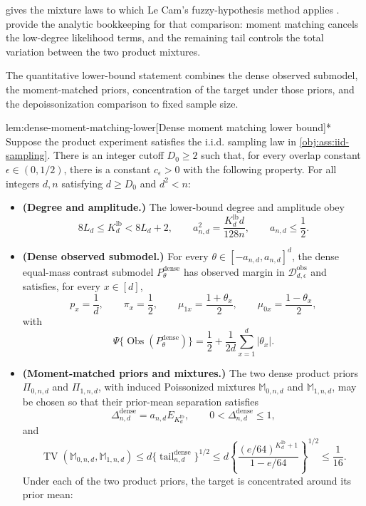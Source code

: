  gives the mixture laws to which Le Cam's fuzzy-hypothesis method applies \citep{LeCam1986,Tsybakov2009}.  provide the analytic bookkeeping for that comparison: moment matching cancels the low-degree likelihood terms, and the remaining tail controls the total variation between the two product mixtures.

The quantitative lower-bound statement combines the dense observed submodel, the moment-matched priors, concentration of the target under those priors, and the depoissonization comparison to fixed sample size.

\begin{lemmav}{lem:dense-moment-matching-lower}[Dense moment matching lower bound]*
Suppose the product experiment satisfies the i.i.d. sampling law in \cref{obj:ass:iid-sampling}.  There is an integer cutoff \(D_0\geq2\) such that, for every overlap constant \(\epsilon\in(0,1/2)\), there is a constant \(c_\epsilon>0\) with the following property.  For all integers \(d,n\) satisfying \(d\geq D_0\) and \(d^2<n\):
\begin{itemize}
\item \textbf{(Degree and amplitude.)} The lower-bound degree and amplitude obey
\[
8L_d\leq K_d^{\mathrm{lb}}<8L_d+2,
\qquad
a_{n,d}^2=\frac{K_d^{\mathrm{lb}}d}{128n},
\qquad
a_{n,d}\leq \frac12 .
\]
\item \textbf{(Dense observed submodel.)} For every \(\theta\in[-a_{n,d},a_{n,d}]^d\), the dense equal-mass contrast submodel \(P_\theta^{\mathrm{dense}}\) has observed margin in \(\mathcal D_{d,\epsilon}^{\mathrm{obs}}\) and satisfies, for every \(x\in[d]\),
\[
p_x=\frac1d,
\qquad
\pi_x=\frac12,
\qquad
\mu_{1x}=\frac{1+\theta_x}{2},
\qquad
\mu_{0x}=\frac{1-\theta_x}{2},
\]
with
\[
\Psi\{\operatorname{Obs}(P_\theta^{\mathrm{dense}})\}
=
\frac12+\frac{1}{2d}\sum_{x=1}^d|\theta_x|.
\]
\item \textbf{(Moment-matched priors and mixtures.)} The two dense product priors \(\Pi_{0,n,d}\) and \(\Pi_{1,n,d}\), with induced Poissonized mixtures \(\mathbb M_{0,n,d}\) and \(\mathbb M_{1,n,d}\), may be chosen so that their prior-mean separation satisfies
\[
\Delta_{n,d}^{\mathrm{dense}}
=
a_{n,d}E_{K_d^{\mathrm{lb}}},
\qquad
0<\Delta_{n,d}^{\mathrm{dense}}\leq1,
\]
and
\[
\operatorname{TV}(\mathbb M_{0,n,d},\mathbb M_{1,n,d})
\leq
d\{\operatorname{tail}_{n,d}^{\mathrm{dense}}\}^{1/2}
\leq
d\left\{\frac{(e/64)^{K_d^{\mathrm{lb}}+1}}{1-e/64}\right\}^{1/2}
\leq\frac1{16}.
\]
Under each of the two product priors, the target is concentrated around its prior mean:

\end{itemize}
\end{lemmav}
